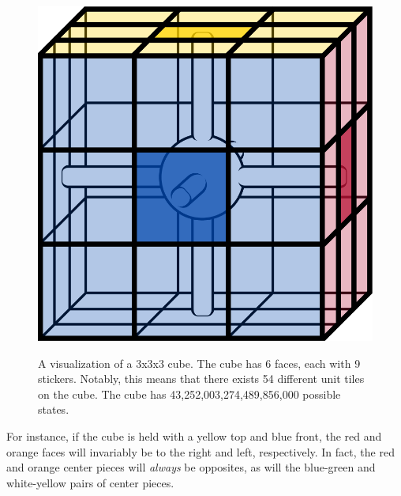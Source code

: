 \documentclass[12pt]{article}
\begin{document}
\begin{figure}[h]
    \hfill 
    \begin{minipage}[c]{0.2\textwidth} 
        \centering
        \includegraphics[scale=0.1]{moves/core.png}
    \end{minipage}
    \hfill 
    \begin{minipage}[c]{0.59\textwidth} 
        \vspace*{\fill} 
        A visualization of a 3x3x3 cube. The cube has 6 faces, each with 9 stickers. Notably, this means that there exists 54 different unit tiles on the cube. The cube has 43,252,003,274,489,856,000 possible states.\footnotemark
        \vspace*{\fill}
    \end{minipage}
    \hfill 
\end{figure}

For instance, if the cube is held with a yellow top and blue front, the red and orange faces will invariably be to the right and left, respectively. In fact, the red and orange center pieces will \textit{always} be opposites, as will the blue-green and white-yellow pairs of center pieces.\\
\end{document}
